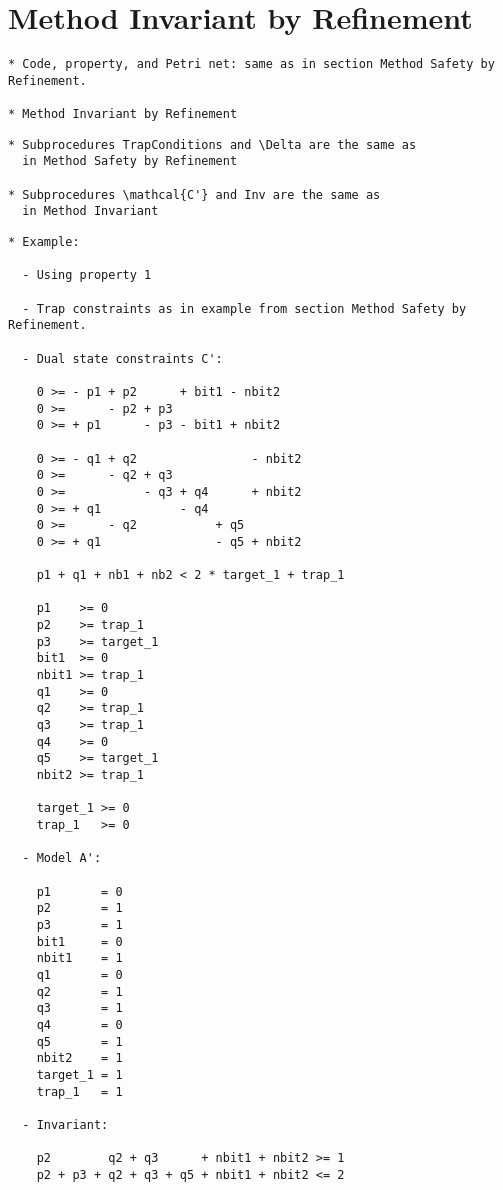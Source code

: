 \documentclass{llncs}
\begin{document}
\section{Method Invariant by Refinement}

\begin{verbatim}
* Code, property, and Petri net: same as in section Method Safety by Refinement.

* Method Invariant by Refinement
\end{verbatim}





\begin{verbatim}
* Subprocedures TrapConditions and \Delta are the same as
  in Method Safety by Refinement

* Subprocedures \mathcal{C'} and Inv are the same as
  in Method Invariant
\end{verbatim}

\newpage

\begin{verbatim}
* Example:

  - Using property 1

  - Trap constraints as in example from section Method Safety by Refinement.
  
  - Dual state constraints C':

    0 >= - p1 + p2      + bit1 - nbit2
    0 >=      - p2 + p3
    0 >= + p1      - p3 - bit1 + nbit2

    0 >= - q1 + q2                - nbit2
    0 >=      - q2 + q3
    0 >=           - q3 + q4      + nbit2
    0 >= + q1           - q4
    0 >=      - q2           + q5
    0 >= + q1                - q5 + nbit2

    p1 + q1 + nb1 + nb2 < 2 * target_1 + trap_1

    p1    >= 0
    p2    >= trap_1
    p3    >= target_1
    bit1  >= 0
    nbit1 >= trap_1
    q1    >= 0
    q2    >= trap_1
    q3    >= trap_1
    q4    >= 0
    q5    >= target_1
    nbit2 >= trap_1

    target_1 >= 0
    trap_1   >= 0

  - Model A':

    p1       = 0
    p2       = 1
    p3       = 1
    bit1     = 0
    nbit1    = 1
    q1       = 0
    q2       = 1
    q3       = 1
    q4       = 0
    q5       = 1
    nbit2    = 1
    target_1 = 1
    trap_1   = 1
    
  - Invariant:

    p2        q2 + q3      + nbit1 + nbit2 >= 1
    p2 + p3 + q2 + q3 + q5 + nbit1 + nbit2 <= 2

\end{verbatim}




\end{document}
